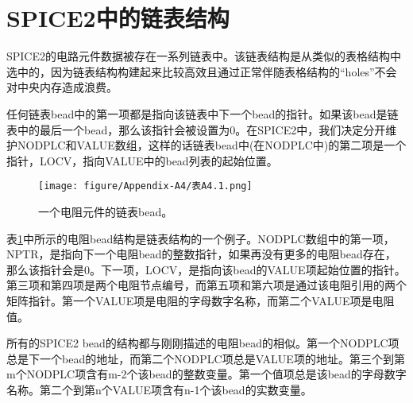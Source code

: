 \section{SPICE2中的链表结构}
SPICE2的电路元件数据被存在一系列链表中。该链表结构是从类似的表格结构中选中的，因为链表结构构建起来比较高效且通过正常伴随表格结构的“holes”不会对中央内存造成浪费。

任何链表bead中的第一项都是指向该链表中下一个bead的指针。如果该bead是链表中的最后一个bead，那么该指针会被设置为0。在SPICE2中，我们决定分开维护NODPLC和VALUE数组，这样的话链表bead中(在NODPLC中)的第二项是一个指针，LOCV，指向VALUE中的bead列表的起始位置。

\begin{figure}[htbp]
\small
    \centering
    \texttt{[image: figure/Appendix-A4/表A4.1.png]}
    \caption{一个电阻元件的链表bead。}
    \label{表A4.1}
\end{figure}

表\ref{表A4.1}中所示的电阻bead结构是链表结构的一个例子。NODPLC数组中的第一项，NPTR，是指向下一个电阻bead的整数指针，如果再没有更多的电阻bead存在，那么该指针会是0。下一项，LOCV，是指向该bead的VALUE项起始位置的指针。第三项和第四项是两个电阻节点编号，而第五项和第六项是通过该电阻引用的两个矩阵指针。第一个VALUE项是电阻的字母数字名称，而第二个VALUE项是电阻值。

所有的SPICE2 bead的结构都与刚刚描述的电阻bead的相似。第一个NODPLC项总是下一个bead的地址，而第二个NODPLC项总是VALUE项的地址。第三个到第m个NODPLC项含有m-2个该bead的整数变量。第一个值项总是该bead的字母数字名称。第二个到第n个VALUE项含有n-1个该bead的实数变量。
